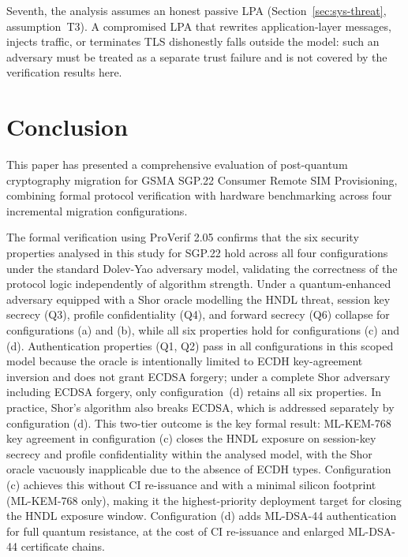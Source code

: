 \documentclass[a4paper,fleqn]{cas-sc}
\begin{document}
Seventh, the analysis assumes an honest passive LPA (Section~\ref{sec:sys-threat},
assumption~T3). A compromised LPA that rewrites application-layer
messages, injects traffic, or terminates TLS dishonestly falls outside
the model: such an adversary must be treated as a separate trust failure
and is not covered by the verification results here.

\section{Conclusion}
\label{sec:conclusion}

This paper has presented a comprehensive evaluation of post-quantum
cryptography migration for GSMA SGP.22 Consumer Remote SIM Provisioning,
combining formal protocol verification with hardware benchmarking across
four incremental migration configurations.

The formal verification using ProVerif 2.05 confirms that the six
security properties analysed in this study for SGP.22 hold across all
four configurations under the standard Dolev-Yao adversary model, validating the correctness of the
protocol logic independently of algorithm strength. Under a
quantum-enhanced adversary equipped with a Shor oracle modelling the
HNDL threat, session key secrecy (Q3), profile confidentiality (Q4),
and forward secrecy (Q6) collapse for configurations (a) and (b), while
all six properties hold for configurations (c) and (d). Authentication
properties (Q1, Q2) pass in all configurations in this scoped model because
the oracle is intentionally limited to ECDH key-agreement inversion and does
not grant ECDSA forgery; under a complete Shor adversary including ECDSA
forgery, only configuration~(d) retains all six properties. In practice,
Shor's algorithm also breaks ECDSA, which is addressed separately by
configuration (d). This two-tier
outcome is the key formal result: ML-KEM-768 key agreement in
configuration (c) closes the HNDL exposure on session-key secrecy and
profile confidentiality within the analysed model, with the Shor oracle
vacuously inapplicable due to the absence of ECDH types.
Configuration (c) achieves this without CI re-issuance and with a minimal
silicon footprint (ML-KEM-768 only), making it the highest-priority
deployment target for closing the HNDL exposure window. Configuration (d)
adds ML-DSA-44 authentication for full quantum resistance, at the cost of
CI re-issuance and enlarged ML-DSA-44 certificate chains.
\end{document}

